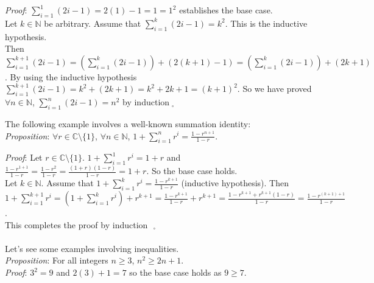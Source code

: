 \documentclass[12pt]{amsart}
\theoremstyle{definition}
\theoremstyle{remark}
\newcommand{\nats}{\mathbb N}
\newcommand{\complex}{\mathbb C}
\begin{document}
\emph{Proof}:  $\displaystyle \sum_{i=1}^1 (2i-1)=2(1)-1=1=1^2$ establishes the base case.\\

Let $k\in\nats$ be arbitrary.  Assume that $\displaystyle \sum_{i=1}^k (2i-1)=k^2$.  This is the inductive hypothesis.\\

Then  $\displaystyle \sum_{i=1}^{k+1} (2i-1)=\left(\sum_{i=1}^{k} (2i-1)\right)+(2(k+1)-1)=\left(\sum_{i=1}^{k} (2i-1)\right)+(2k+1)$.  By using the inductive hypothesis $\displaystyle \sum_{i=1}^{k+1} (2i-1)=k^2+(2k+1)=k^2+2k+1=(k+1)^2$.  So we have proved $\forall n\in\nats$, $\displaystyle \sum_{i=1}^n (2i-1)=n^2$ by induction$\;_{\square}$


\newpage


The following example involves a well-known summation identity:\\

\emph{Proposition}:  $\forall r\in \complex\setminus\{ 1\}$, $\forall n\in \nats$, $\displaystyle 1+\sum_{i=1}^{n}r^{i}=\frac{1-r^{n+1}}{1-r}$.

\bigskip

\emph{Proof}:  Let $r\in\complex\setminus\{1\}$.  $\displaystyle 1+\sum_{i=1}^{1}r^{i}=1+r$ and $\displaystyle \frac{1-r^{1+1}}{1-r}=\frac{1-r^2}{1-r}=\frac{(1+r)(1-r)}{1-r}=1+r$.  So the base case holds.\\

Let $k\in\nats$.  Assume that $1+\displaystyle \sum_{i=1}^{k}r^{i}=\frac{1-r^{k+1}}{1-r}$ (inductive hypothesis).  Then\\

$\displaystyle 1+\sum_{i=1}^{k+1}r^{i}=\left(1+\sum_{i=1}^{k}r^{i}\right)+r^{k+1}=\frac{1-r^{k+1}}{1-r}+r^{k+1}=\frac{1-r^{k+1}+r^{k+1}(1-r)}{1-r}=\frac{1-r^{(k+1)+1}}{1-r}$.\\

  This completes the proof by induction$\mbox{ }_{\square}$\\ \\



Let's see some examples involving inequalities.\\


\emph{Proposition}:  For all integers $n\geq 3$, $n^2\geq 2n+1$.\\

\emph{Proof}:  $3^2=9$ and $2(3)+1=7$ so the base case holds as $9\geq 7$.\\
\end{document}
